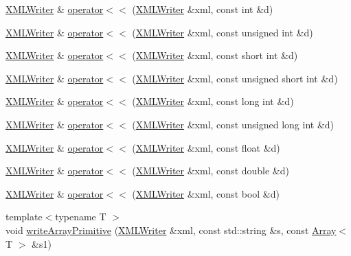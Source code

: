 \begin{DoxyCompactItemize}
\item 
\mbox{\hyperlink{classADATXML_1_1XMLWriter}{X\+M\+L\+Writer}} \& \mbox{\hyperlink{group__io_gab642b539df5696daa03675faadf87dfc}{operator$<$$<$}} (\mbox{\hyperlink{classADATXML_1_1XMLWriter}{X\+M\+L\+Writer}} \&xml, const int \&d)
\item 
\mbox{\hyperlink{classADATXML_1_1XMLWriter}{X\+M\+L\+Writer}} \& \mbox{\hyperlink{group__io_ga24986bf3413f6b83f58f5941f2c68db7}{operator$<$$<$}} (\mbox{\hyperlink{classADATXML_1_1XMLWriter}{X\+M\+L\+Writer}} \&xml, const unsigned int \&d)
\item 
\mbox{\hyperlink{classADATXML_1_1XMLWriter}{X\+M\+L\+Writer}} \& \mbox{\hyperlink{group__io_ga2892faecb11d9475723b52bcae10aa04}{operator$<$$<$}} (\mbox{\hyperlink{classADATXML_1_1XMLWriter}{X\+M\+L\+Writer}} \&xml, const short int \&d)
\item 
\mbox{\hyperlink{classADATXML_1_1XMLWriter}{X\+M\+L\+Writer}} \& \mbox{\hyperlink{group__io_gac4bf68c17fbdb50450cfa2d338d09685}{operator$<$$<$}} (\mbox{\hyperlink{classADATXML_1_1XMLWriter}{X\+M\+L\+Writer}} \&xml, const unsigned short int \&d)
\item 
\mbox{\hyperlink{classADATXML_1_1XMLWriter}{X\+M\+L\+Writer}} \& \mbox{\hyperlink{group__io_gadc0e2c541a279b5a007e13f6f73ecf45}{operator$<$$<$}} (\mbox{\hyperlink{classADATXML_1_1XMLWriter}{X\+M\+L\+Writer}} \&xml, const long int \&d)
\item 
\mbox{\hyperlink{classADATXML_1_1XMLWriter}{X\+M\+L\+Writer}} \& \mbox{\hyperlink{group__io_gaaf0b05a50d9a15119bf89b91d941b9d2}{operator$<$$<$}} (\mbox{\hyperlink{classADATXML_1_1XMLWriter}{X\+M\+L\+Writer}} \&xml, const unsigned long int \&d)
\item 
\mbox{\hyperlink{classADATXML_1_1XMLWriter}{X\+M\+L\+Writer}} \& \mbox{\hyperlink{group__io_ga5bf37d07fe43369189518f64fd8ca05d}{operator$<$$<$}} (\mbox{\hyperlink{classADATXML_1_1XMLWriter}{X\+M\+L\+Writer}} \&xml, const float \&d)
\item 
\mbox{\hyperlink{classADATXML_1_1XMLWriter}{X\+M\+L\+Writer}} \& \mbox{\hyperlink{group__io_ga3325d0cff5609ce8a1d74b516e9dfcf8}{operator$<$$<$}} (\mbox{\hyperlink{classADATXML_1_1XMLWriter}{X\+M\+L\+Writer}} \&xml, const double \&d)
\item 
\mbox{\hyperlink{classADATXML_1_1XMLWriter}{X\+M\+L\+Writer}} \& \mbox{\hyperlink{group__io_ga9d2ed7a5f0ca12a3b4f993f19ee4473e}{operator$<$$<$}} (\mbox{\hyperlink{classADATXML_1_1XMLWriter}{X\+M\+L\+Writer}} \&xml, const bool \&d)
\item 
{\footnotesize template$<$typename T $>$ }\\void \mbox{\hyperlink{namespaceADATXML_a6f40a822deea06e9a305fee4e7d89a17}{write\+Array\+Primitive}} (\mbox{\hyperlink{classADATXML_1_1XMLWriter}{X\+M\+L\+Writer}} \&xml, const std\+::string \&s, const \mbox{\hyperlink{classXMLArray_1_1Array}{Array}}$<$ T $>$ \&s1)

\end{DoxyCompactItemize}
